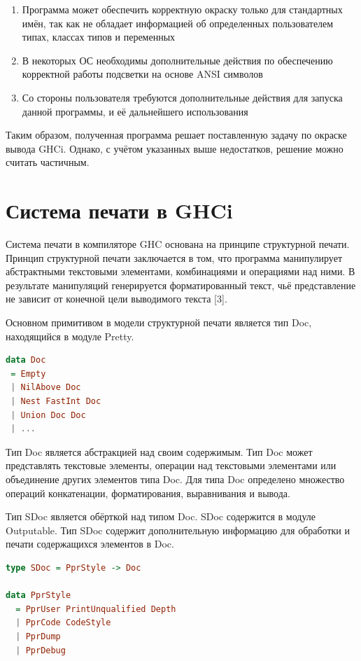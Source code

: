 \begin{enumerate}
\item Программа может обеспечить корректную окраску только для стандартных имён, так как не обладает информацией об определенных пользователем типах, классах типов и переменных
\item В некоторых ОС необходимы дополнительные действия по обеспечению корректной работы подсветки на основе ANSI символов
\item Со стороны пользователя требуются дополнительные действия для запуска данной программы, и её дальнейшего использования
\end{enumerate}

Таким образом, полученная программа решает поставленную задачу по окраске вывода GHCi. Однако, с учётом указанных выше недостатков, решение можно считать частичным.

\section{Система печати в GHCi}
Система печати в компиляторе GHC основана на принципе структурной печати. Принцип структурной печати заключается в том, что программа манипулирует абстрактными текстовыми элементами, комбинациями и операциями над ними. В результате манипуляций генерируется форматированный текст, чьё представление не зависит от конечной цели выводимого текста [3].

Основном примитивом в модели структурной печати является тип Doc, находящийся в модуле Pretty.
\begin{lstlisting}[language=Haskell]
data Doc
 = Empty
 | NilAbove Doc
 | Nest FastInt Doc
 | Union Doc Doc
 | ...
\end{lstlisting}

Тип Doc является абстракцией над своим содержимым. Тип Doc может представлять текстовые элементы, операции над текстовыми элементами или объединение других элементов типа Doc. Для типа Doc определено множество операций конкатенации, форматирования, выравнивания и вывода.

Тип SDoc является обёрткой над типом Doc. SDoc содержится в модуле Outputable. Тип SDoc содержит дополнительную информацию для обработки и печати содержащихся элементов в Doc.

\begin{lstlisting}[language=Haskell]
type SDoc = PprStyle -> Doc

data PprStyle
  = PprUser PrintUnqualified Depth
  | PprCode CodeStyle
  | PprDump
  | PprDebug
\end{lstlisting}

